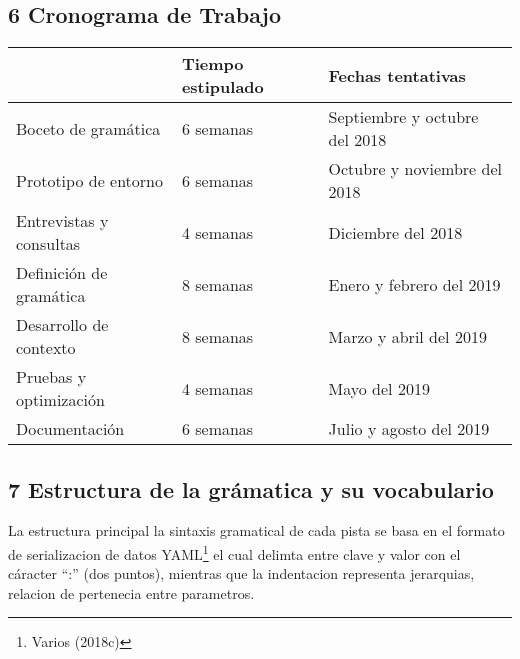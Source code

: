 \documentclass[]{article}
\begin{document}
\begin{center}
     
\end{center}

\newpage

\hypertarget{cronograma-de-trabajo}{%
\subsection{6 Cronograma de Trabajo}\label{cronograma-de-trabajo}}

\begin{longtable}[]{@{}lll@{}}
\toprule
& Tiempo estipulado & Fechas tentativas\tabularnewline
\midrule
\endhead
Boceto de gramática & 6 semanas & Septiembre y octubre del
2018\tabularnewline
Prototipo de entorno & 6 semanas & Octubre y noviembre del
2018\tabularnewline
Entrevistas y consultas & 4 semanas & Diciembre del 2018\tabularnewline
Definición de gramática & 8 semanas & Enero y febrero del
2019\tabularnewline
Desarrollo de contexto & 8 semanas & Marzo y abril del
2019\tabularnewline
Pruebas y optimización & 4 semanas & Mayo del 2019\tabularnewline
Documentación & 6 semanas & Julio y agosto del 2019\tabularnewline
\bottomrule
\end{longtable}

\newpage

\hypertarget{estructura-de-la-gruxe1matica-y-su-vocabulario}{%
\subsection{7 Estructura de la grámatica y su
vocabulario}\label{estructura-de-la-gruxe1matica-y-su-vocabulario}}

La estructura principal la sintaxis gramatical de cada pista se basa en
el formato de serializacion de datos YAML\footnote{Varios (2018c)} el
cual delimta entre clave y valor con el cáracter ``:'' (dos puntos),
mientras que la indentacion representa jerarquias, relacion de
pertenecia entre parametros.
\end{document}
